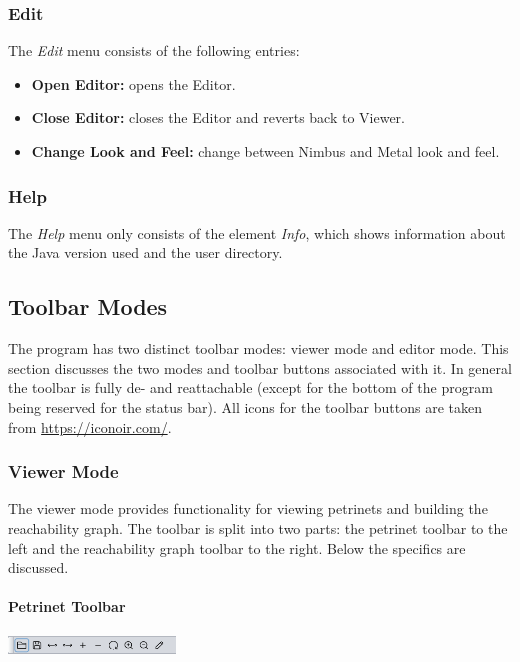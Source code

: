 \documentclass[10pt, a4paper]{article}
\begin{document}
\subsubsection{Edit}


The \textit{Edit} menu consists of the following entries:


\begin{itemize}
\item \textbf{Open Editor:} opens the Editor.
\item \textbf{Close Editor:} closes the Editor and reverts back to Viewer.
\item \textbf{Change Look and Feel:} change between Nimbus and Metal look and feel.
\end{itemize}

\subsubsection{Help}

The \textit{Help} menu only consists of the element \textit{Info}, which shows information about the Java version used and the user directory.

\subsection{Toolbar Modes}
\label{label:modes}
The program has two distinct toolbar modes: viewer mode and editor mode. This section discusses the two modes and toolbar buttons associated with it. In general the toolbar is fully de- and reattachable (except for the bottom of the program being reserved for the status bar). All icons for the toolbar buttons are taken from \url{https://iconoir.com/}.

\subsubsection{Viewer Mode}

The viewer mode provides functionality for viewing petrinets and building the reachability graph. The toolbar is split into two parts: the petrinet toolbar to the left and the reachability graph toolbar to the right. Below the specifics are discussed.

\paragraph{Petrinet Toolbar}

\includegraphics[height=0.5cm]{Viewer_Petrinet_Toolbar.png}
\label{label:viewer}
\end{document}
